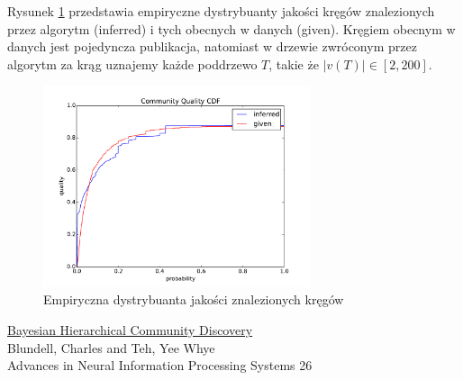 \documentclass{article}
\begin{document}
Rysunek \ref{cdf} przedstawia empiryczne dystrybuanty jakości kręgów
znalezionych przez algorytm (inferred) i tych obecnych w danych (given).
Kręgiem obecnym w danych jest pojedyncza publikacja, natomiast w drzewie
zwróconym przez algorytm za krąg uznajemy każde poddrzewo $T$, takie że
$|v(T)| \in [2, 200]$.

\begin{figure}
\begin{center}
\includegraphics[width=0.7\textwidth]{quality_cdf.pdf}
\end{center}
\caption{Empiryczna dystrybuanta jakości znalezionych kręgów}
\label{cdf}
\end{figure}

\begin{thebibliography}{4}
    \href{http://papers.nips.cc/paper/5048-bayesian-hierarchical-community-discovery.pdf}
    {Bayesian Hierarchical Community Discovery}\\
    Blundell, Charles and Teh, Yee Whye\\
    Advances in Neural Information Processing Systems 26
\end{thebibliography}
\end{document}
